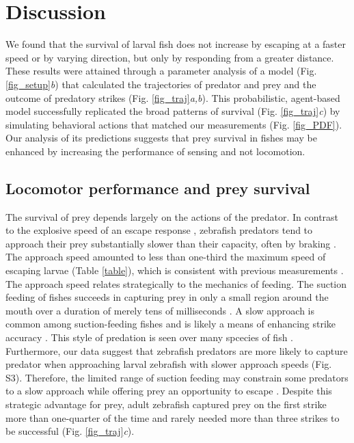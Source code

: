 \documentclass[]{rsos}%
\begin{document}
\pagebreak

\section{Discussion}%

We found that the survival of larval fish does not increase by escaping at a faster speed or by varying direction, but only by responding from a greater distance.
These results were attained through a parameter analysis of a model (Fig. \ref{fig_setup}\textit{b}) that calculated the trajectories of predator and prey and the outcome of predatory strikes (Fig. \ref{fig_traj}\textit{a,b}). 
This probabilistic, agent-based model successfully replicated the broad patterns of survival (Fig. \ref{fig_traj}\textit{c}) by simulating behavioral actions that matched our measurements (Fig. \ref{fig_PDF}).
Our analysis of its predictions suggests that prey survival in fishes may be enhanced by increasing the performance of sensing and not locomotion.

\subsection{Locomotor performance and prey survival} 

The survival of prey depends largely on the actions of the predator.
In contrast to the explosive speed of an escape response \cite{Muller:2004hp}, zebrafish predators tend to approach their prey substantially slower than their capacity, often by braking \cite{McHenry:2005tc}.
The approach speed amounted to less than one-third the maximum speed of escaping larvae (Table \ref{table}), which is consistent with previous measurements \cite{Stewart:2013bha}.
The approach speed relates strategically to the mechanics of feeding.
The suction feeding of fishes succeeds in capturing prey in only a small region around the mouth over a duration of merely tens of milliseconds \cite{FerryGraham:2003bz,Higham:2005kg,Holzman:2007p15907}.
A slow approach is common among suction-feeding fishes and is likely a means of enhancing strike accuracy \cite{Webb:1984jz,Higham:2007go}.
This style of predation is seen over many spcecies of fish \cite{Higham:2007hy}.
Furthermore, our data suggest that zebrafish predators are more likely to capture predator when approaching larval zebrafish with slower approach speeds (Fig. S3).
Therefore, the limited range of suction feeding may constrain some predators to a slow approach while offering prey an opportunity to escape \cite{Holzman:2009uu}.
Despite this strategic advantage for prey, adult zebrafish captured prey on the first strike more than one-quarter of the time and rarely needed more than three strikes to be successful (Fig. \ref{fig_traj}\textit{c}).
\end{document}
